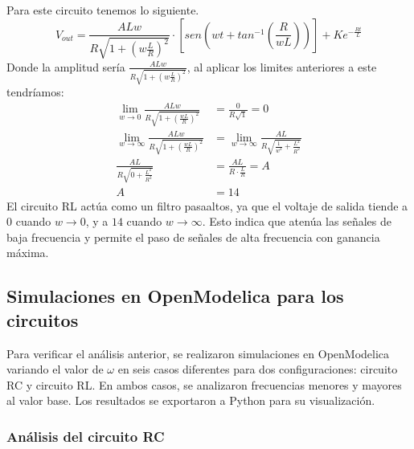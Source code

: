 \documentclass{article}
\begin{document}
Para este circuito tenemos lo siguiente.
\[
    V_{out}=\frac{ALw}{R\sqrt{1+(w\frac{L}{R})^2}}\cdot [sen(wt+tan^{-1}(\frac{R}{wL}))]+Ke^{-\frac{Rt}{L}}
\]
Donde la amplitud sería \(\frac{ALw}{R\sqrt{1+(w\frac{L}{R})^2}}\), al aplicar los limites anteriores a este tendríamos:
\begin{align*}
    \lim_{w \to 0}\frac{ALw}{R\sqrt{1+(\frac{wL}{R})^2}}&=\frac{0}{R\sqrt{1}}=0 \\
    \lim_{w \to \infty}\frac{ALw}{R\sqrt{1+(\frac{wL}{R})^2}}&= \lim_{w \to \infty}\frac{AL}{R\sqrt{\frac{1}{w^2}+\frac{L^2}{R^2}}} \\
    \frac{AL}{R\sqrt{0+\frac{L^2}{R^2}}}&=\frac{AL}{R\cdot \frac{L}{R}}=A \\
    A&=14
\end{align*}
El circuito RL actúa como un filtro pasaaltos, ya que el voltaje de salida tiende a $0$ cuando $w \to 0$, y a $14$ cuando $w \to \infty$. Esto indica que atenúa las señales de baja frecuencia y permite el paso de señales de alta frecuencia con ganancia máxima.
\subsection{Simulaciones en OpenModelica para los circuitos}

Para verificar el análisis anterior, se realizaron simulaciones en OpenModelica variando el valor de $\omega$ en seis casos diferentes para dos configuraciones: circuito RC y circuito RL. En ambos casos, se analizaron frecuencias menores y mayores al valor base. Los resultados se exportaron a Python para su visualización.

\subsubsection{Análisis del circuito RC}
\end{document}
